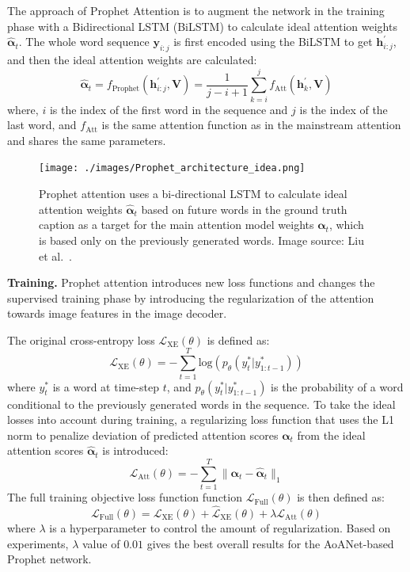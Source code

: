 \documentclass[english,twoside,openright]{HYgraduMLDS}
\newcommand{\matr}[1]{\bm{#1}}
\newcommand{\vect}[1]{\bm{#1}}
\begin{document}
The approach of Prophet Attention is to augment the network in the training phase with a Bidirectional LSTM (BiLSTM) to calculate ideal attention weights $\hat{\vect{\alpha}}_t$. The whole word sequence $\vect{y}_{i:j}$ is first encoded using the BiLSTM to get $\vect{h}^{'}_{i:j}$, and then the ideal attention weights are calculated:
\begin{equation}
\hat{\vect{\alpha}}_t = f_{\text{Prophet}}(\vect{h}^{'}_{i:j}, \matr{V}) = \frac{1}{j-i+1} \sum_{k=i}^j f_{\text{Att}}(\vect{h}^{'}_k , \matr{V})
\end{equation}
%
where, $i$ is the index of the first word in the sequence and $j$ is the index of the last word, and $f_{\text{Att}}$ is the same attention function as in the mainstream attention and shares the same parameters.

\begin{figure}[h] 
\centering
\texttt{[image: ./images/Prophet\_architecture\_idea.png]}
\caption{Prophet attention uses a bi-directional LSTM to calculate ideal attention weights $\vect{\hat{\alpha}}_t$ based on future words in the ground truth caption as a target for the main attention model weights $\vect{\alpha}_t$, which is based only on the previously generated words. Image source: Liu et al.~\cite{Prophet}.}
\label{fig:Prophet_architecture_idea} 
\end{figure}

\textbf{Training.} Prophet attention introduces new loss functions and changes the supervised training phase by introducing the regularization of the attention towards image features in the image decoder.

The original cross-entropy loss $\mathcal{L}_{\text{XE}}(\theta)$ is defined as:
\begin{equation}
\mathcal{L}_{\text{XE}}(\theta) = - \sum_{t=1}^T \text{log}(p_\theta(y^*_t | y^*_{1:t-1}))
\end{equation}
%
where $y^*_t$ is a word at time-step $t$, and $p_\theta(y^*_t | y^*_{1:t-1})$ is the probability of a word conditional to the previously generated words in the sequence. To take the ideal losses into account during training, a regularizing loss function that uses the L1 norm to penalize deviation of predicted attention scores $\vect{\alpha}_t$ from the ideal attention scores $\hat{\vect{\alpha}}_t$ is introduced:
\begin{equation}
\mathcal{L}_{\text{Att}}(\theta) = - \sum_{t=1}^T {\lVert}\vect{\alpha}_t - \hat{\vect{\alpha}}_t{\rVert}_1
\end{equation}
%
The full training objective loss function function $\mathcal{L}_{\text{Full}}(\theta)$ is then defined as:
\begin{equation}
\mathcal{L}_{\text{Full}}(\theta) = \mathcal{L}_{\text{XE}}(\theta) + \hat{\mathcal{L}}_{\text{XE}}(\theta) + \lambda \mathcal{L}_{\text{Att}}(\theta)
\end{equation}
%
where $\lambda$ is a hyperparameter to control the amount of regularization. Based on experiments, $\lambda$ value of $0.01$ gives the best overall results for the AoANet-based Prophet network.
\end{document}
